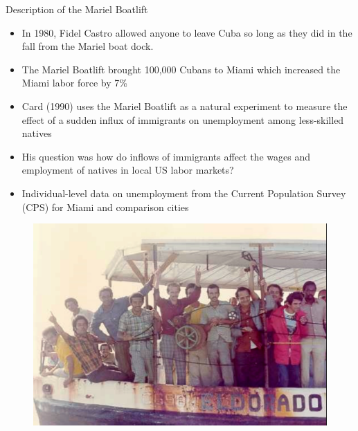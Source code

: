 \documentclass{beamer}
\begin{document}
\begin{frame}{Description of the Mariel Boatlift}
	
	\begin{itemize}
	\item In 1980, Fidel Castro allowed anyone to leave Cuba so long as they did in the fall from the Mariel boat dock.
	\item The Mariel Boatlift brought 100,000 Cubans to Miami which increased the Miami labor force by 7\%
	\item Card (1990) uses the Mariel Boatlift as a natural experiment to measure the effect of a sudden influx of immigrants on unemployment among less-skilled natives
	\item His question was how do inflows of immigrants affect the wages and employment of natives in local US labor markets?
	\item Individual-level data on unemployment from the Current Population Survey (CPS) for Miami and comparison cities
	\end{itemize}
\end{frame}


\begin{frame}[plain]
	\begin{figure}
	\includegraphics[scale=0.25]{./lecture_includes/boatlift2.png}
	\end{figure}
\end{frame}
\end{document}
